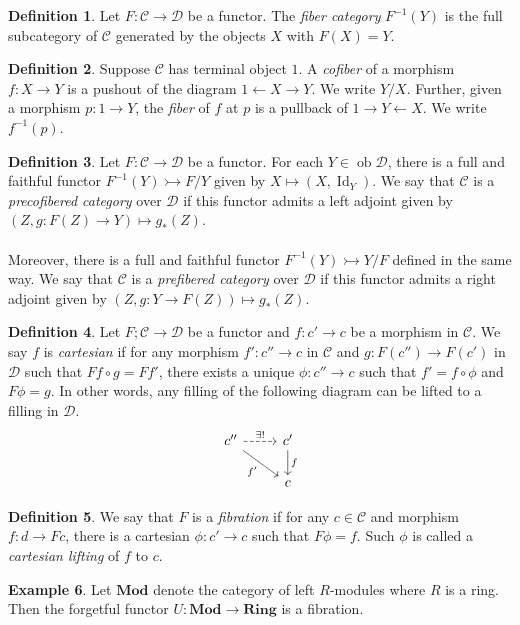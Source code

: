 \documentclass[10pt,letterpaper,cm]{nupset}
\theoremstyle{definition}
\newtheorem{definition}{Definition}
\newtheorem{exmp}[definition]{Example}
\theoremstyle{theorem}
\theoremstyle{remark}
\newcommand{\1}{\mathbf{1}}
\renewcommand{\c}{\mathscr{C}}
\renewcommand{\d}{\mathscr{D}}
\newcommand{\0}{\vec 0}
\DeclareMathOperator{\id}{Id}
\DeclareMathOperator{\ob}{ob}
\begin{document}
\begin{definition}
Let $F : \c \to \d$ be a functor. The \textit{fiber category} $F^{-1}(Y)$ is the full subcategory of $\c$ generated by the objects $X$ with $F(X) =Y$.
\end{definition}

\begin{definition}
Suppose $\c$ has terminal object $1$. A \textit{cofiber} of a morphism $f: X \to Y$ is a pushout of the diagram $1 \leftarrow X \rightarrow Y$. We write $Y/X$. Further, given a morphism $p: 1 \to Y$, the \textit{fiber} of $f$ at $p$ is a pullback of $1 \rightarrow Y \leftarrow X$. We write $f^{-1}(p)$.
\end{definition}

\begin{definition}
Let $F : \c \to \d$ be a functor. For each $Y \in \ob \d$, there is a full and faithful functor $F^{-1}(Y)  \rightarrowtail F/Y$ given by $X \mapsto (X, \id_Y)$. We say that $\c$ is a \textit{precofibered category} over $\d$ if this functor admits a left adjoint given by $(Z, g: F(Z) \to Y) \mapsto g_{\ast}(Z)$.
\\ \\
Moreover, there is a full and faithful functor $F^{-1}(Y) \rightarrowtail Y/F$ defined in the same way. We say that $\c$ is a \textit{prefibered category} over $\d$ if this functor admits a right adjoint given by $(Z, g: Y \to F(Z)) \mapsto g_{\ast}(Z)$.
\end{definition}

\begin{definition}
Let $F ; \c \to \d$ be a functor and $f: c' \to c$ be a morphism in $\c$. We say $f$ is \textit{cartesian} if for any morphism $f' : c'' \to c$ in $\c$ and $g : F(c'') \to F(c')$ in $\d$ such that $Ff \circ g = Ff'$, there exists a unique $\phi : c'' \to c$ such that $f' = f \circ \phi$ and $F\phi = g$. In other words, any filling of the following diagram can be lifted to a filling in $\d$.
\[ \begin{tikzcd}
c'' \arrow[r, dashed, "\exists!"] \arrow[swap, dr,  " f' "] & c' \arrow[d, "f"] \\%
 & c
\end{tikzcd}
\]
\end{definition}

\begin{definition}
We say that $F$ is a \textit{fibration} if for any $c \in \c$ and morphism $f: d \to Fc$, there is a cartesian $\phi : c' \to c$ such that $F\phi =f$. Such $\phi$ is called a \textit{cartesian lifting} of $f$ to $c$.
\end{definition}

\begin{exmp}
Let $\mathbf{Mod}$ denote the category of left $R$-modules where $R$ is a ring. Then the forgetful functor $U: \mathbf{Mod} \to \mathbf{Ring}$ is a fibration.
\end{exmp}
\end{document}
